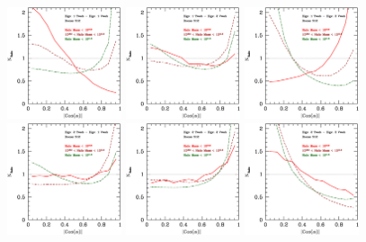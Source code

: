 \documentclass[usenatbib]{mn2e}
\begin{document}
\begin{figure}
\includegraphics[width=0.30\textwidth]{../plot2/512/512_T1V1.ps}
\includegraphics[width=0.30\textwidth]{../plot2/512/512_T1V2.ps}
\includegraphics[width=0.30\textwidth]{../plot2/512/512_T1V3.ps}
\includegraphics[width=0.30\textwidth]{../plot2/512/512_T2V1.ps}
\includegraphics[width=0.30\textwidth]{../plot2/512/512_T2V2.ps}
\includegraphics[width=0.30\textwidth]{../plot2/512/512_T2V3.ps}

\end{figure}
\end{document}
